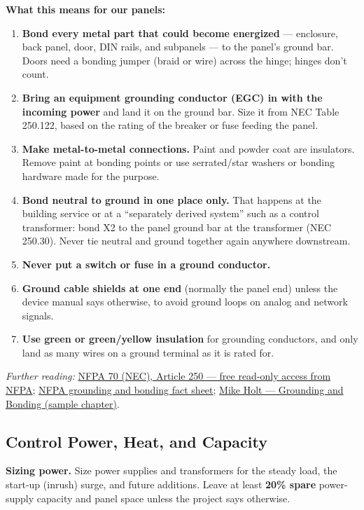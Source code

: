 \textbf{What this means for our panels:}
\begin{enumerate}[itemsep=2pt]
  \item \textbf{Bond every metal part that could become energized} --- enclosure, back panel, door, DIN rails, and subpanels --- to the panel's ground bar. Doors need a bonding jumper (braid or wire) across the hinge; hinges don't count.
  \item \textbf{Bring an equipment grounding conductor (EGC) in with the incoming power} and land it on the ground bar. Size it from NEC Table 250.122, based on the rating of the breaker or fuse feeding the panel.
  \item \textbf{Make metal-to-metal connections.} Paint and powder coat are insulators. Remove paint at bonding points or use serrated/star washers or bonding hardware made for the purpose.
  \item \textbf{Bond neutral to ground in one place only.} That happens at the building service or at a ``separately derived system'' such as a control transformer: bond X2 to the panel ground bar at the transformer (NEC 250.30). Never tie neutral and ground together again anywhere downstream.
  \item \textbf{Never put a switch or fuse in a ground conductor.}
  \item \textbf{Ground cable shields at one end} (normally the panel end) unless the device manual says otherwise, to avoid ground loops on analog and network signals.
  \item \textbf{Use green or green/yellow insulation} for grounding conductors, and only land as many wires on a ground terminal as it is rated for.
\end{enumerate}
\textit{Further reading:} \href{https://link.nfpa.org/all-publications/70/2023}{NFPA 70 (NEC), Article 250 --- free read-only access from NFPA}; \href{https://www.nfpa.org/forms/grounding-and-bonding-fact-sheet}{NFPA grounding and bonding fact sheet}; \href{https://www.mikeholt.com/instructor2/img/product/pdf/1292448885sample.pdf}{Mike Holt --- Grounding and Bonding (sample chapter)}.

\subsection{Control Power, Heat, and Capacity}\label{sec:heat}
\textbf{Sizing power.} Size power supplies and transformers for the steady load, the start-up (inrush) surge, and future additions. Leave at least \textbf{20\% spare} power-supply capacity and panel space unless the project says otherwise.

